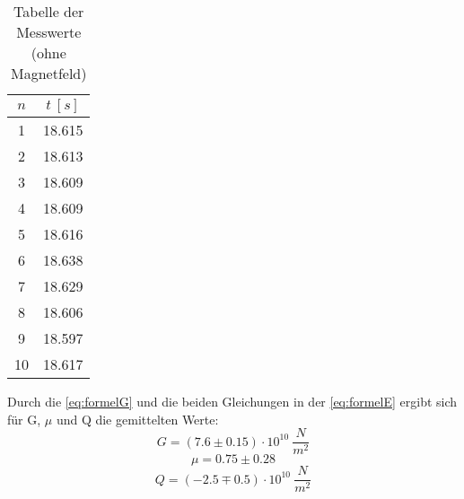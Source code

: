 \begin{table}[htp]
  \centering
  \caption{Tabelle der Messwerte (ohne Magnetfeld)}
  \label{tab:tabb}
  \begin{tabular}{c c}
      \toprule
      $ n $ & $t \ [s]$\\
      \midrule
      1 & 18.615\\
      2 & 18.613\\
      3 & 18.609\\
      4 & 18.609\\
      5 & 18.616\\
      6 & 18.638\\
      7 & 18.629\\
      8 & 18.606\\
      9 & 18.597\\
      10 & 18.617\\
      \bottomrule
  \end{tabular}
\end{table}
\newpage
Durch die \autoref{eq:formelG} und die beiden Gleichungen in der \autoref{eq:formelE} ergibt sich für G, $\mu$ und Q die gemittelten Werte:
\begin{equation}
  G = (7.6 \pm 0.15)\cdot 10^{10}\ \frac{N}{m^2}
\end{equation}
\begin{equation}
  \mu = 0.75 \pm 0.28
\end{equation}
\begin{equation}
  Q = (-2.5 \mp 0.5)\cdot 10^{10}\ \frac{N}{m^2}
\end{equation}